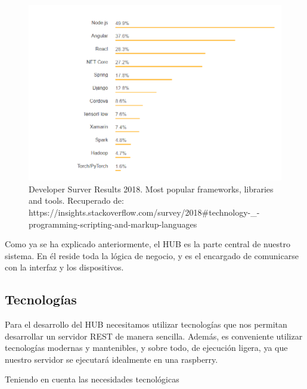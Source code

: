 \begin{figure}[H]
\centering
\includegraphics[width=6.00in]{images/frameworks_populares.png}
\caption{Developer Surver Results 2018. Most popular frameworks, libraries and tools. 
Recuperado de: https://insights.stackoverflow.com/survey/2018\#technology-\_-programming-scripting-and-markup-languages}
\label{fig:frameworks_populares}
\end{figure}

Como ya se ha explicado anteriormente, el HUB es la parte central de nuestro sistema. En él reside toda la lógica de negocio, y es el encargado
de comunicarse con la interfaz y los dispositivos.
\subsection{Tecnologías}
Para el desarrollo del HUB necesitamos utilizar tecnologías que nos permitan desarrollar un servidor REST de manera sencilla. Además, es conveniente
utilizar tecnologías modernas y mantenibles, y sobre todo, de ejecución ligera, ya que nuestro servidor se ejecutará idealmente en una raspberry.
\par
Teniendo en cuenta las necesidades tecnológicas
